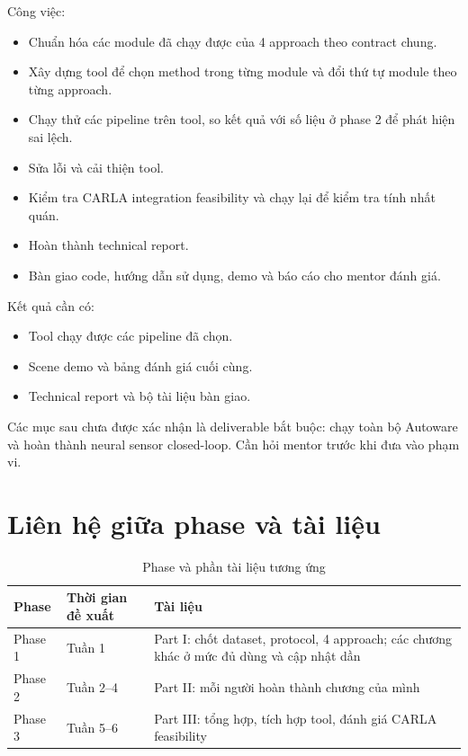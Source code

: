 Công việc:
\begin{itemize}
  \item Chuẩn hóa các module đã chạy được của 4 approach theo contract chung.
  \item Xây dựng tool để chọn method trong từng module và đổi thứ tự module theo từng approach.
  \item Chạy thử các pipeline trên tool, so kết quả với số liệu ở phase 2 để phát hiện sai lệch.
  \item Sửa lỗi và cải thiện tool.
  \item Kiểm tra CARLA integration feasibility và chạy lại để kiểm tra tính nhất quán.
  \item Hoàn thành technical report.
  \item Bàn giao code, hướng dẫn sử dụng, demo và báo cáo cho mentor đánh giá.
\end{itemize}

Kết quả cần có:
\begin{itemize}
  \item Tool chạy được các pipeline đã chọn.
  \item Scene demo và bảng đánh giá cuối cùng.
  \item Technical report và bộ tài liệu bàn giao.
\end{itemize}

\begin{warning}
Các mục sau chưa được xác nhận là deliverable bắt buộc: chạy toàn bộ Autoware và hoàn thành neural sensor closed-loop.
Cần hỏi mentor trước khi đưa vào phạm vi.
\end{warning}

\section{Liên hệ giữa phase và tài liệu}

\begin{table}[H]
  \centering
  \caption{Phase và phần tài liệu tương ứng}
  \begin{tabularx}{\linewidth}{l l X}
    \toprule
    \textbf{Phase} & \textbf{Thời gian đề xuất} & \textbf{Tài liệu} \\
    \midrule
    Phase 1 & Tuần 1 & Part I: chốt dataset, protocol, 4 approach; các chương khác ở mức đủ dùng và cập nhật dần \\
    Phase 2 & Tuần 2--4 & Part II: mỗi người hoàn thành chương của mình \\
    Phase 3 & Tuần 5--6 & Part III: tổng hợp, tích hợp tool, đánh giá CARLA feasibility \\
    \bottomrule
  \end{tabularx}
\end{table}

